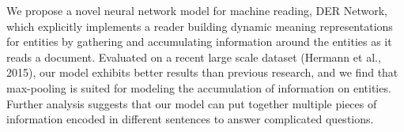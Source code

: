 We propose a novel neural network model for machine reading, DER Network, which explicitly implements a reader building dynamic meaning representations for entities by gathering and accumulating information around the entities as it reads a document. Evaluated on a recent large scale dataset (Hermann et al., 2015), our model exhibits better results than previous research, and we find that max-pooling is suited for modeling the accumulation of information on entities. Further analysis suggests that our model can put together multiple pieces of information encoded in different sentences to answer complicated questions.
